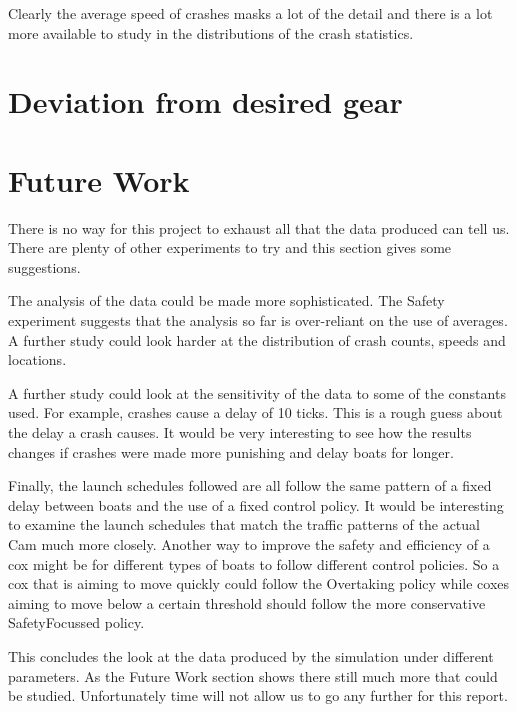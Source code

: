  Clearly the average speed of crashes masks a lot of the detail and there is a lot more available to study in the distributions of the crash statistics.
  
\section{Deviation from desired gear}

\section{Future Work}
There is no way for this project to exhaust all that the data produced can tell us. There are plenty of other experiments to try and this section gives some suggestions.

The analysis of the data could be made more sophisticated. The Safety experiment suggests that the analysis so far is over-reliant on the use of averages. A further study could look harder at the distribution of crash counts, speeds and locations.

A further study could look at the sensitivity of the data to some of the constants used. For example, crashes cause a delay of 10 ticks. This is a rough guess about the delay a crash causes. It would be very interesting to see how the results changes if crashes were made more punishing and delay boats for longer.

Finally, the launch schedules followed are all follow the same pattern of a fixed delay between boats and the use of a fixed control policy. It would be interesting to examine the launch schedules that match the traffic patterns of the actual Cam much more closely. Another way to improve the safety and efficiency of a cox might be for different types of boats to follow different control policies. So a cox that is aiming to move quickly could follow the Overtaking policy while coxes aiming to move below a certain threshold should follow the more conservative SafetyFocussed policy.

This concludes the look at the data produced by the simulation under different parameters. As the Future Work section shows there still much more that could be studied. Unfortunately time will not allow us to go any further for this report.